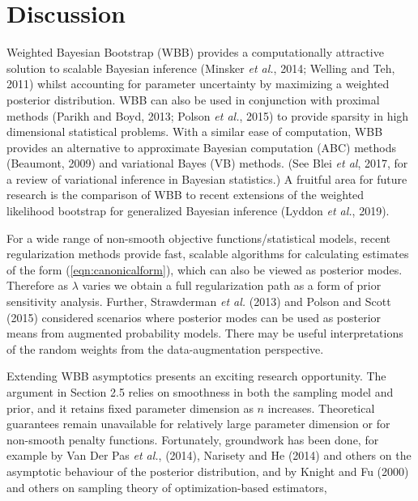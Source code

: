 \documentclass[12pt]{TD-CJS}
\begin{document}
\section{Discussion}
Weighted Bayesian Bootstrap (WBB) provides a computationally attractive solution to scalable Bayesian inference (Minsker {\em et al.}, 2014; Welling and Teh, 2011)
whilst accounting for parameter uncertainty by maximizing a weighted posterior distribution. WBB can also be used in conjunction with proximal methods (Parikh and Boyd, 2013; Polson {\em et al.}, 2015)
to provide  sparsity in high dimensional statistical problems. With a similar ease of computation, WBB provides an alternative to approximate Bayesian computation (ABC)
 methods (Beaumont, 2009) and variational Bayes (VB) methods. (See Blei {\em et al}, 2017, for a review of variational inference in Bayesian statistics.) A fruitful area for future research is the comparison of WBB to recent extensions of 
the weighted likelihood bootstrap for generalized Bayesian inference 
(Lyddon {\em et al.}, 2019).


For a wide range of non-smooth objective functions/statistical models, recent regularization methods provide fast, scalable algorithms for calculating estimates of the form (\ref{eqn:canonicalform}), which can also be viewed as posterior modes. Therefore as $\lambda$ varies we obtain a full regularization path as a form of prior sensitivity analysis. Further, Strawderman {\em et al.} (2013) and Polson and Scott (2015) 
considered scenarios where posterior modes can be used as posterior means from augmented probability models.
There may be useful interpretations of the random weights from the data-augmentation perspective.


Extending WBB asymptotics presents an exciting research opportunity.   
The argument in Section 2.5 
relies on smoothness in both the sampling model and prior, and it retains fixed parameter
dimension as $n$ increases.  Theoretical guarantees remain unavailable for relatively large parameter
dimension or for non-smooth penalty functions.  Fortunately, groundwork has been done, for example by 
Van Der Pas {\em et al.}, (2014), Narisety and  He  (2014) and others on the asymptotic  behaviour of the 
posterior distribution,  and by Knight and Fu (2000) and others on sampling theory of 
optimization-based estimators,
\end{document}
